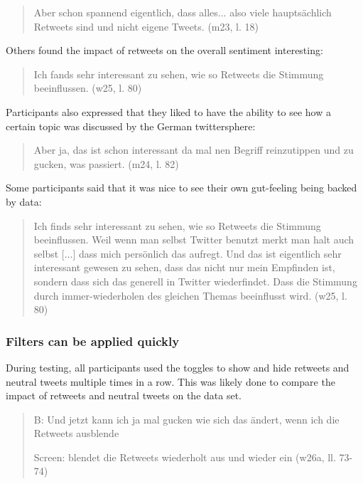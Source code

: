 \begin{quote}
    Aber schon spannend eigentlich, dass alles... also viele hauptsächlich Retweets sind und nicht eigene Tweets. (m23, l. 18)
\end{quote}

Others found the impact of retweets on the overall sentiment interesting:

\begin{quote}
    Ich fands sehr interessant zu sehen, wie so Retweets die Stimmung beeinflussen. (w25, l. 80)
\end{quote}

Participants also expressed that they liked to have the ability to see how a certain topic was discussed by the German twittersphere:

\begin{quote}
    Aber ja, das ist schon interessant da mal nen Begriff reinzutippen und zu gucken, was passiert. (m24, l. 82)
\end{quote}

Some participants said that it was nice to see their own gut-feeling being backed by data:

\begin{quote}
    Ich finds sehr interessant zu sehen, wie so Retweets die Stimmung beeinflussen. Weil wenn man selbst Twitter benutzt merkt man halt auch selbst [...] dass mich persönlich das aufregt. Und das ist eigentlich sehr interessant gewesen zu sehen, dass das nicht nur mein Empfinden ist, sondern dass sich das generell in Twitter wiederfindet. Dass die Stimmung durch immer-wiederholen des gleichen Themas beeinflusst wird. (w25, l. 80)
\end{quote}

\subsubsection*{Filters can be applied quickly}
During testing, all participants used the toggles to show and hide retweets and neutral tweets multiple times in a row. This was likely done to compare the impact of retweets and neutral tweets on the data set.

\begin{quote}
    B: Und jetzt kann ich ja mal gucken wie sich das ändert, wenn ich die Retweets ausblende

    Screen: blendet die Retweets wiederholt aus und wieder ein (w26a, ll. 73-74)
\end{quote}


